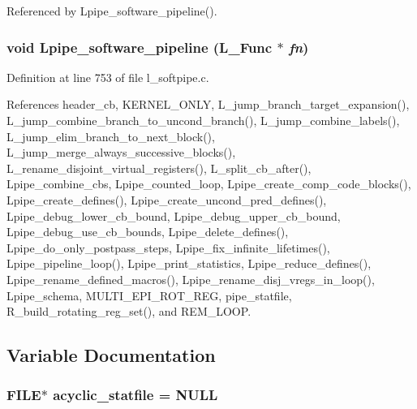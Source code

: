 Referenced by Lpipe\_\-software\_\-pipeline().
\subsubsection{\setlength{\rightskip}{0pt plus 5cm}void Lpipe\_\-software\_\-pipeline (L\_\-Func $\ast$ {\em fn})}\label{l__softpipe_8c_5b303ec4e784e21c2d7d38c47ea63b98}




Definition at line 753 of file l\_\-softpipe.c.

References header\_\-cb, KERNEL\_\-ONLY, L\_\-jump\_\-branch\_\-target\_\-expansion(), L\_\-jump\_\-combine\_\-branch\_\-to\_\-uncond\_\-branch(), L\_\-jump\_\-combine\_\-labels(), L\_\-jump\_\-elim\_\-branch\_\-to\_\-next\_\-block(), L\_\-jump\_\-merge\_\-always\_\-successive\_\-blocks(), L\_\-rename\_\-disjoint\_\-virtual\_\-registers(), L\_\-split\_\-cb\_\-after(), Lpipe\_\-combine\_\-cbs, Lpipe\_\-counted\_\-loop, Lpipe\_\-create\_\-comp\_\-code\_\-blocks(), Lpipe\_\-create\_\-defines(), Lpipe\_\-create\_\-uncond\_\-pred\_\-defines(), Lpipe\_\-debug\_\-lower\_\-cb\_\-bound, Lpipe\_\-debug\_\-upper\_\-cb\_\-bound, Lpipe\_\-debug\_\-use\_\-cb\_\-bounds, Lpipe\_\-delete\_\-defines(), Lpipe\_\-do\_\-only\_\-postpass\_\-steps, Lpipe\_\-fix\_\-infinite\_\-lifetimes(), Lpipe\_\-pipeline\_\-loop(), Lpipe\_\-print\_\-statistics, Lpipe\_\-reduce\_\-defines(), Lpipe\_\-rename\_\-defined\_\-macros(), Lpipe\_\-rename\_\-disj\_\-vregs\_\-in\_\-loop(), Lpipe\_\-schema, MULTI\_\-EPI\_\-ROT\_\-REG, pipe\_\-statfile, R\_\-build\_\-rotating\_\-reg\_\-set(), and REM\_\-LOOP.

\subsection{Variable Documentation}
\subsubsection{\setlength{\rightskip}{0pt plus 5cm}FILE$\ast$ \bf{acyclic\_\-statfile} = NULL}\label{l__softpipe_8c_e08449fa1216f1e3436bf8d7fe73731f}




